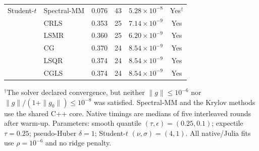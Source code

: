 \begin{table}[htbp]
\begin{tabular}{llrrrc}
Student-$t$
& Spectral-MM & 0.076 & 43 & $5.28\times10^{-8}$ & Yes$^{\dagger}$ \\
& CRLS & 0.353 & 25 & $7.14\times10^{-9}$ & Yes \\
& LSMR & 0.360 & 25 & $6.20\times10^{-9}$ & Yes \\
& CG & 0.370 & 24 & $8.54\times10^{-9}$ & Yes \\
& LSQR & 0.374 & 24 & $8.54\times10^{-9}$ & Yes \\
& CGLS & 0.374 & 24 & $8.54\times10^{-9}$ & Yes \\

\bottomrule
\end{tabular}
\par\smallskip
\begin{minipage}{\linewidth}
\footnotesize
$^{\dagger}$The solver declared convergence, but neither $\|g\|\leq 10^{-6}$ nor
$\|g\|/(1+\|g_0\|)\leq 10^{-8}$ was satisfied.
Spectral-MM and the Krylov methods use the shared C++ core.
Native timings are medians of five interleaved rounds after warm-up.
Parameters: smooth quantile $(\tau,\epsilon)=(0.25,0.1)$; expectile $\tau=0.25$;
pseudo-Huber $\delta=1$; Student-$t$ $(\nu,\sigma)=(4,1)$.
All native/Julia fits use $\rho=10^{-6}$ and no ridge penalty.
\end{minipage}
\end{table}

\clearpage

